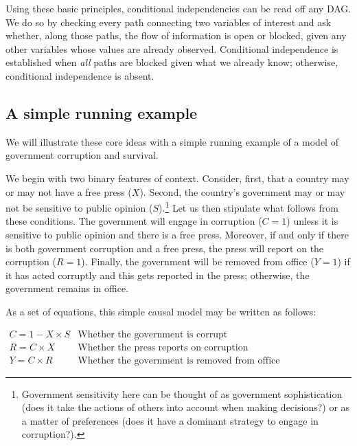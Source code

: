 \documentclass[
  12pt,
]{book}
\begin{document}
Using these basic principles, conditional independencies can be read off any DAG. We do so by checking every path connecting two variables of interest and ask whether, along those paths, the flow of information is open or blocked, given any other variables whose values are already observed. Conditional independence is established when \emph{all} paths are blocked given what we already know; otherwise, conditional independence is absent.

\hypertarget{a-simple-running-example}{%
\subsection{A simple running example}\label{a-simple-running-example}}

We will illustrate these core ideas with a simple running example of a model of government corruption and survival.

We begin with two binary features of context. Consider, first, that a country may or may not have a free press (\(X\)). Second, the country's government may or may not be sensitive to public opinion (\(S\)).\footnote{Government sensitivity here can be thought of as government sophistication (does it take the actions of others into account when making decisions?) or as a matter of preferences (does it have a dominant strategy to engage in corruption?).} Let us then stipulate what follows from these conditions. The government will engage in corruption (\(C=1\)) unless it is sensitive to public opinion and there is a free press. Moreover, if and only if there is both government corruption and a free press, the press will report on the corruption (\(R=1\)). Finally, the government will be removed from office (\(Y=1\)) if it has acted corruptly and this gets reported in the press; otherwise, the government remains in office.

As a set of equations, this simple causal model may be written as follows:

\(\begin{array}{ll} C = 1-X\times S & \mbox{Whether the government is corrupt}\\ R = C\times X & \mbox{Whether the press reports on corruption}\\ Y = C\times R & \mbox{Whether the government is removed from office} \end{array}\)
\end{document}
